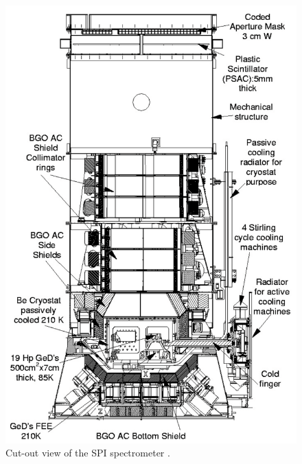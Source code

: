 \documentclass{report}
\begin{document}
\begin{figure}
  \includegraphics[width=\linewidth]{Images/General/SPI_cut_view_verdenne_2003.PNG}
  \vspace{-20pt}
  \caption{Cut-out view of the SPI spectrometer \cite{refId0}.}
  \vspace{-20pt}
  \label{SPI cut view}
\end{figure}
\end{document}
